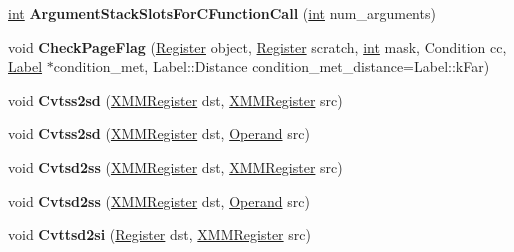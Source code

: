 \begin{DoxyCompactItemize}
\mbox{\hyperlink{classint}{int}} {\bfseries Argument\+Stack\+Slots\+For\+C\+Function\+Call} (\mbox{\hyperlink{classint}{int}} num\+\_\+arguments)
\item 
\mbox{\label{classv8_1_1internal_1_1TurboAssembler_af9ac2510de674a7d5f3289a74cc0701d}} 
void {\bfseries Check\+Page\+Flag} (\mbox{\hyperlink{classv8_1_1internal_1_1Register}{Register}} object, \mbox{\hyperlink{classv8_1_1internal_1_1Register}{Register}} scratch, \mbox{\hyperlink{classint}{int}} mask, Condition cc, \mbox{\hyperlink{classv8_1_1internal_1_1Label}{Label}} $\ast$condition\+\_\+met, Label\+::\+Distance condition\+\_\+met\+\_\+distance=Label\+::k\+Far)
\item 
\mbox{\label{classv8_1_1internal_1_1TurboAssembler_af3359cc771f99315fe8e990e93921163}} 
void {\bfseries Cvtss2sd} (\mbox{\hyperlink{classv8_1_1internal_1_1XMMRegister}{X\+M\+M\+Register}} dst, \mbox{\hyperlink{classv8_1_1internal_1_1XMMRegister}{X\+M\+M\+Register}} src)
\item 
\mbox{\label{classv8_1_1internal_1_1TurboAssembler_ad6f86f587778a08a980b92fbe3d31c34}} 
void {\bfseries Cvtss2sd} (\mbox{\hyperlink{classv8_1_1internal_1_1XMMRegister}{X\+M\+M\+Register}} dst, \mbox{\hyperlink{classv8_1_1internal_1_1Operand}{Operand}} src)
\item 
\mbox{\label{classv8_1_1internal_1_1TurboAssembler_abbbb18e057f07ea5e56f5f8e2c5f91ad}} 
void {\bfseries Cvtsd2ss} (\mbox{\hyperlink{classv8_1_1internal_1_1XMMRegister}{X\+M\+M\+Register}} dst, \mbox{\hyperlink{classv8_1_1internal_1_1XMMRegister}{X\+M\+M\+Register}} src)
\item 
\mbox{\label{classv8_1_1internal_1_1TurboAssembler_a94fea71f9c0c42923a273ee0ba0c42ce}} 
void {\bfseries Cvtsd2ss} (\mbox{\hyperlink{classv8_1_1internal_1_1XMMRegister}{X\+M\+M\+Register}} dst, \mbox{\hyperlink{classv8_1_1internal_1_1Operand}{Operand}} src)
\item 
\mbox{\label{classv8_1_1internal_1_1TurboAssembler_ab7969f26e677cac09c1b33c1ba93c39b}} 
void {\bfseries Cvttsd2si} (\mbox{\hyperlink{classv8_1_1internal_1_1Register}{Register}} dst, \mbox{\hyperlink{classv8_1_1internal_1_1XMMRegister}{X\+M\+M\+Register}} src)

\end{DoxyCompactItemize}
